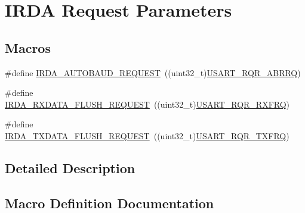 \hypertarget{group___i_r_d_a___request___parameters}{}\section{I\+R\+DA Request Parameters}
\label{group___i_r_d_a___request___parameters}
\subsection*{Macros}
\begin{DoxyCompactItemize}
\item 
\#define \hyperlink{group___i_r_d_a___request___parameters_ga6431d33b8cf9df0d86e29a210df6d454}{I\+R\+D\+A\+\_\+\+A\+U\+T\+O\+B\+A\+U\+D\+\_\+\+R\+E\+Q\+U\+E\+ST}~((uint32\+\_\+t)\hyperlink{group___peripheral___registers___bits___definition_gad261e1474dfb5329b5520e22790b026b}{U\+S\+A\+R\+T\+\_\+\+R\+Q\+R\+\_\+\+A\+B\+R\+RQ})
\item 
\#define \hyperlink{group___i_r_d_a___request___parameters_gade40b479c4ee0227c2851e7eb3f0f930}{I\+R\+D\+A\+\_\+\+R\+X\+D\+A\+T\+A\+\_\+\+F\+L\+U\+S\+H\+\_\+\+R\+E\+Q\+U\+E\+ST}~((uint32\+\_\+t)\hyperlink{group___peripheral___registers___bits___definition_ga7b148ee7c697bbcf836648063613612a}{U\+S\+A\+R\+T\+\_\+\+R\+Q\+R\+\_\+\+R\+X\+F\+RQ})
\item 
\#define \hyperlink{group___i_r_d_a___request___parameters_ga15f0617bb3c52ca8936f1d9127274ac9}{I\+R\+D\+A\+\_\+\+T\+X\+D\+A\+T\+A\+\_\+\+F\+L\+U\+S\+H\+\_\+\+R\+E\+Q\+U\+E\+ST}~((uint32\+\_\+t)\hyperlink{group___peripheral___registers___bits___definition_gaa40d2e52b5955b30c9399eb3dec769e8}{U\+S\+A\+R\+T\+\_\+\+R\+Q\+R\+\_\+\+T\+X\+F\+RQ})
\end{DoxyCompactItemize}


\subsection{Detailed Description}


\subsection{Macro Definition Documentation}
\mbox{\label{group___i_r_d_a___request___parameters_ga6431d33b8cf9df0d86e29a210df6d454}} 
